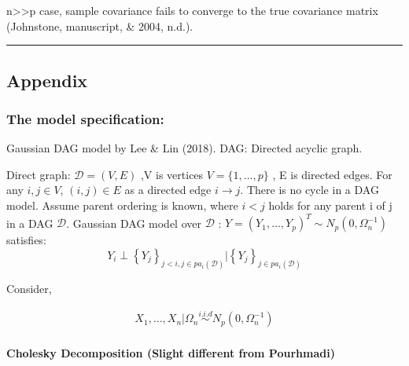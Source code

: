 \documentclass[]{article}
\let\oldparagraph\paragraph
\renewcommand{\paragraph}[1]{\oldparagraph{#1}\mbox{}}
\begin{document}
n\textgreater{}\textgreater{}p case, sample covariance fails to converge
to the true covariance matrix (Johnstone, manuscript, \& 2004, n.d.).

\begin{center}\rule{0.5\linewidth}{\linethickness}\end{center}

\hypertarget{appendix}{%
\subsection{Appendix}\label{appendix}}

\hypertarget{the-model-specification}{%
\subsubsection{The model specification:}\label{the-model-specification}}

Gaussian DAG model by Lee \& Lin (2018). DAG: Directed acyclic graph.

Direct graph: \(\mathcal { D } = ( V , E )\) ,V is vertices
\(V = \{ 1 , \ldots , p \}\) , E is directed edges. For any
\(i,j\in V\), \((i,j)\in E\) as a directed edge \(i\rightarrow j\).
There is no cycle in a DAG model. Assume parent ordering is known, where
\(i<j\) holds for any parent i of j in a DAG \(\mathcal D\). Gaussian
DAG model over \(\mathcal D\) :
\(Y = \left( Y _ { 1 } , \ldots , Y _ { p } \right) ^ { T } \sim N _ { p } \left( 0 , \Omega _ { n } ^ { - 1 } \right)\)
satisfies: \[
Y _ { i } \perp \left\{ Y _ { j } \right\} _ { j < i , j \in p a _ { i } ( \mathcal { D } ) }|  \left\{ Y _ { j } \right\} _ { j \in p a _ { i } ( \mathcal { D } ) }
\]

Consider,


\begin{align}
X _ { 1 },\ldots , X _ { n } | \Omega_{ n } \overset{i.i.d}{\sim} N _ { p } \left( 0 , \Omega _ { n } ^ { - 1 } \right)
\end{align}


\hypertarget{cholesky-decomposition-slight-different-from-pourhmadi}{%
\paragraph{Cholesky Decomposition (Slight different from
Pourhmadi)}\label{cholesky-decomposition-slight-different-from-pourhmadi}}
\end{document}
